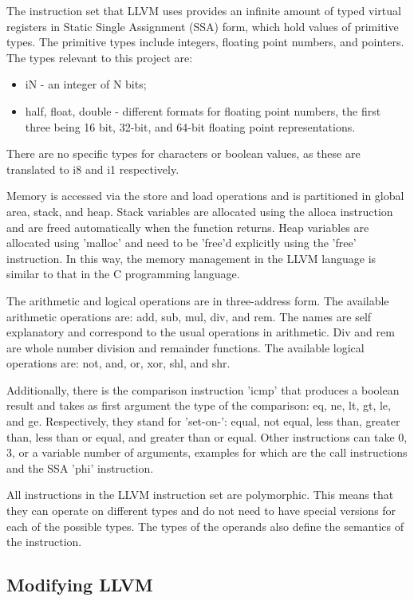 \documentclass[parskip]{cs4rep}
\begin{document}
The instruction set that LLVM uses provides an infinite amount of typed virtual registers in Static Single Assignment (SSA) form, which hold values of primitive types. The primitive types include integers, floating point numbers, and pointers. The types relevant to this project are:
\begin{itemize}
\item iN - an integer of N bits;
\item half, float, double - different formats for floating point numbers, the first three being 16 bit, 32-bit, and 64-bit floating point representations.
\end{itemize}

There are no specific types for characters or boolean values, as these are translated to i8 and i1 respectively.

Memory is accessed via the store and load operations and is partitioned in global area, stack, and heap. Stack variables are allocated using the alloca instruction and are freed automatically when the function returns. Heap variables are allocated using 'malloc' and need to be 'free'd explicitly using the 'free' instruction. In this way, the memory management in the LLVM language is similar to that in the C programming language.

The arithmetic and logical operations are in three-address form. The available arithmetic operations are: add, sub, mul, div, and rem. The names are self explanatory and correspond to the usual operations in arithmetic. Div and rem are whole number division and remainder functions. The available logical operations are: not, and, or, xor, shl, and shr.

Additionally, there is the comparison instruction 'icmp' that produces a boolean result and takes as first argument the type of the comparison: eq, ne, lt, gt, le, and ge. Respectively, they stand for 'set-on-': equal, not equal, less than, greater than, less than or equal, and greater than or equal. Other instructions can take 0, 3, or a variable number of arguments, examples for which are the call instructions and the SSA 'phi' instruction.

All instructions in the LLVM instruction set are polymorphic. This means that they can operate on different types and do not need to have special versions for each of the possible types. The types of the operands also define the semantics of the instruction.

\subsection{Modifying LLVM}
\end{document}
